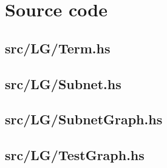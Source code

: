 \documentclass[12pt,a4paper]{article}
\begin{document}
\begin{thebibliography}{9}
\end{thebibliography}


\appendix

\section{Source code}\label{code}

\subsection{src/LG/Term.hs}\label{code:term}

\subsection{src/LG/Subnet.hs}\label{code:net}

\subsection{src/LG/SubnetGraph.hs}\label{code:netgraph}

\subsection{src/LG/TestGraph.hs}\label{code:test}
\end{document}
